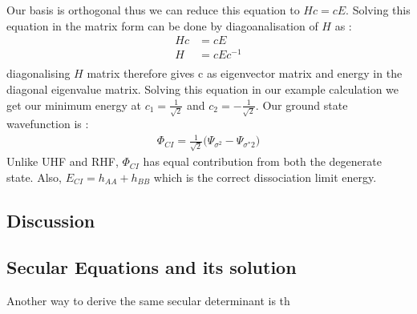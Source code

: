 \documentclass[11pt]{article}   	%
\begin{document}
	Our basis is orthogonal thus we can reduce this equation to $Hc=cE$. Solving this equation in the 
	matrix form can be done by diagoanalisation of $H$ as :
	\begin{equation}
	\begin{split}
		Hc&=cE\\
		H&=cEc^{-1}\\
	\end{split}
	\end{equation}
	diagonalising $H$ matrix therefore gives c as eigenvector matrix and energy in the diagonal 
	eigenvalue matrix. Solving this equation in our example calculation
	 we get our minimum energy at $c_1=\frac{1}{\sqrt{2}}$ and $c_2=-\frac{1}{\sqrt{2}}$. Our
	 ground state wavefunction is :\\
	\begin{equation}
	\begin{split}
		\Phi_{CI}=\frac{1}{\sqrt{2}}\big(\Psi_{\sigma^2}-\Psi_{\sigma^*2}\big)
	\end{split}
	\end{equation}
	Unlike UHF and RHF, $\Phi_{CI}$ has equal contribution from both the degenerate state. 
	Also, $E_{CI}=h_{AA}+h_{BB}$ which is the correct dissociation limit energy.\\ 
	\subsection{Discussion}	
	\subsection{Secular Equations and its solution}
	Another way to derive the same secular determinant is th
\end{document}
